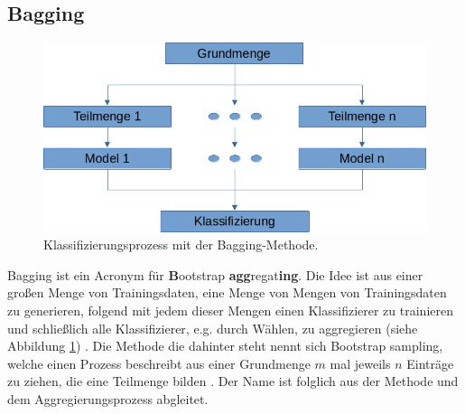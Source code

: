 \subsection{Bagging}
\begin{figure}
    \centering
    \includegraphics[width=0.6\linewidth]{images/bagging.jpg}
    \caption{Klassifizierungsprozess mit der Bagging-Methode.}
    \label{fig:bagging}
\end{figure}
Bagging ist ein Acronym für \glqq \textbf{B}ootstrap \textbf{agg}regat\textbf{ing}\grqq. Die Idee ist aus einer großen Menge von Trainingsdaten, eine Menge von Mengen von Trainingsdaten zu generieren, folgend mit jedem
dieser Mengen einen Klassifizierer zu trainieren und schließlich alle Klassifizierer, e.g. durch Wählen, zu aggregieren (siehe Abbildung \ref{fig:bagging}) \cite{breiman1996bagging}. Die Methode die dahinter steht nennt
sich \glqq Bootstrap sampling\grqq, welche einen Prozess beschreibt aus einer Grundmenge $m$ mal jeweils $n$ Einträge zu ziehen, die eine Teilmenge bilden \cite{efron1992bootstrap}. Der Name ist folglich aus der Methode
und dem Aggregierungsprozess abgleitet.